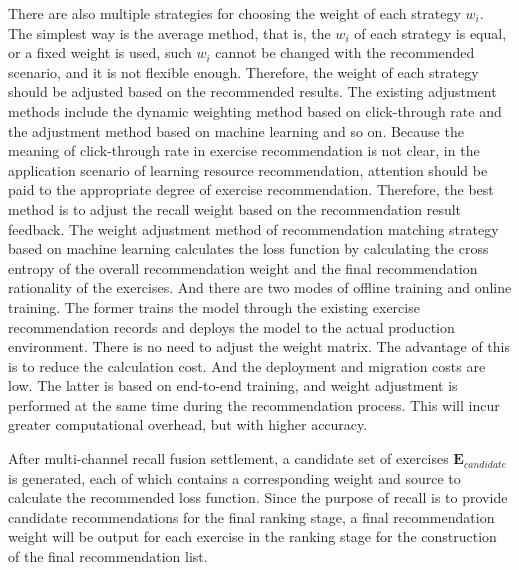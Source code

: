 
There are also multiple strategies for choosing the weight of each strategy \(w_i\). The simplest way is the average method, that is, the \(w_i\) of each strategy is equal, or a fixed weight is used, such \( w_i\) cannot be changed with the recommended scenario, and it is not flexible enough. Therefore, the weight of each strategy should be adjusted based on the recommended results. The existing adjustment methods include the dynamic weighting method based on click-through rate and the adjustment method based on machine learning and so on. Because the meaning of click-through rate in exercise recommendation is not clear, in the application scenario of learning resource recommendation, attention should be paid to the appropriate degree of exercise recommendation. Therefore, the best method is to adjust the recall weight based on the recommendation result feedback. The weight adjustment method of recommendation matching strategy based on machine learning calculates the loss function by calculating the cross entropy of the overall recommendation weight and the final recommendation rationality of the exercises. And there are two modes of offline training and online training. The former trains the model through the existing exercise recommendation records and deploys the model to the actual production environment. There is no need to adjust the weight matrix. The advantage of this is to reduce the calculation cost. And the deployment and migration costs are low. The latter is based on end-to-end training, and weight adjustment is performed at the same time during the recommendation process. This will incur greater computational overhead, but with higher accuracy.

After multi-channel recall fusion settlement, a candidate set of exercises \(\mathbf{E}_{candidate}\) is generated, each of which contains a corresponding weight and source to calculate the recommended loss function. Since the purpose of recall is to provide candidate recommendations for the final ranking stage, a final recommendation weight will be output for each exercise in the ranking stage for the construction of the final recommendation list.


